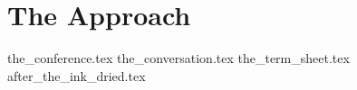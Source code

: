 \part{The Approach}


{the_conference.tex}
{the_conversation.tex}
{the_term_sheet.tex}
{after_the_ink_dried.tex}